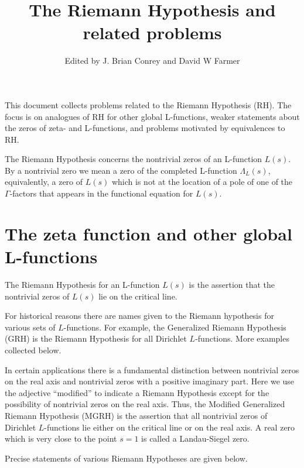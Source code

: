 \documentclass[12pt,letterpaper, reqno]{amsart}
\begin{document}
\title{The Riemann Hypothesis and related problems}
\author{Edited by J. Brian Conrey and David W Farmer}



\maketitle

This document collects problems related to the Riemann Hypothesis (RH).
The focus is on
analogues of RH for other global L-functions, weaker statements
about the zeros of zeta- and L-functions, and problems motivated
by equivalences to RH.

The Riemann Hypothesis concerns the nontrivial zeros
of an L-function $L(s)$.
By a nontrivial zero we mean a zero of the completed L-function
$\Lambda_L(s)$, equivalently, a zero of $L(s)$ which is not at the
location of a pole of one of the $\Gamma$-factors that appears in
the functional equation for $L(s)$.

\section{The zeta function and other global L-functions}


The Riemann Hypothesis for an L-function $L(s)$ is the assertion that the
nontrivial zeros of $L(s)$ lie on the
critical line.  

For historical reasons there are
names given to the Riemann hypothesis for various sets
of $L$-functions.  For example, 
the Generalized Riemann Hypothesis (GRH) is
the Riemann Hypothesis for all Dirichlet $L$-functions.
More examples collected below.

In certain applications there is a fundamental distinction
between nontrivial zeros on the real axis and 
nontrivial zeros with a positive imaginary part.
Here we use the adjective  ``modified'' to indicate
a Riemann Hypothesis except for the possibility
of nontrivial zeros on the real axis.  Thus, the
Modified Generalized Riemann Hypothesis (MGRH) is
the assertion that all nontrivial zeros of 
Dirichlet $L$-functions lie either on the 
critical line or on the real axis.
A real zero which is very close to the point $s=1$ is
called a Landau-Siegel zero.  

Precise statements of various Riemann Hypotheses are given below.
\end{document}

